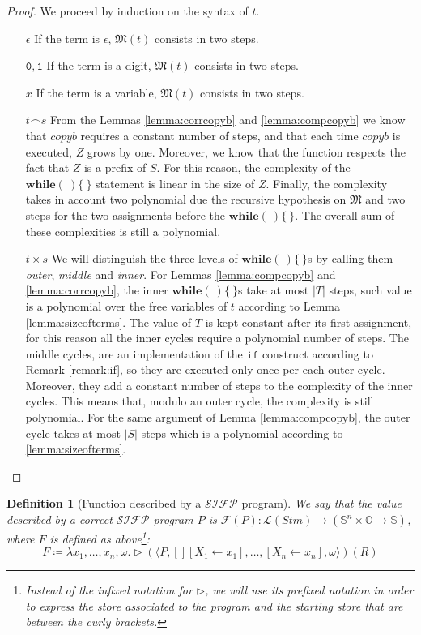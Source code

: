\documentclass[10pt]{amsart}
\newcommand{\SIFP}{\mathcal{SIFP}}
\newcommand{\conc}{\frown}
\newcommand{\zero}{\mathtt{0}}
\newcommand{\one}{\mathtt{1}}
\newcommand{\vone}{x}
\renewcommand{\SS}{\mathbb{S}}
\newcommand{\OO}{\mathbb{O}}
\newcommand{\If}{\mathtt{if}}
\newcommand{\lang}[1]{\mathcal L(#1)}
\newcommand{\while}[2]{\mathbf{while}(#1)\{#2\}}
\newcommand{\as}[2]{[#1 \leftarrow #2]}
\newcommand{\ssos}{\triangleright}
\newcommand{\MM}{\mathfrak M}
\newtheorem{defn}{Definition}
\begin{document}
\begin{proof}
We proceed by induction on the syntax of $t$.
\begin{itemize}
\item[$\epsilon$] If the term is $\epsilon$, $\MM(t)$ consists in two steps.
\item[$\zero,\one$] If the term is a digit,  $\MM(t)$ consists in two steps.
\item[$\vone$] If the term is a variable, $\MM(t)$ consists in two steps.
\item[$t \conc s$] From the Lemmas \ref{lemma:corrcopyb} and \ref{lemma:compcopyb} we know that $copyb$ requires a constant number of steps, and that each time $copyb$ is executed, $Z$ grows by one. Moreover, we know that the function respects the fact that $Z$ is a prefix of $S$. For this reason, the complexity of the $\while\ \ $ statement is linear in the size of $Z$. Finally, the complexity takes in account two polynomial due the recursive hypothesis on $\MM$ and two steps for the two assignments before the $\while\ \ $. The overall sum of these complexities is still a polynomial.
\item[$t \times s$] We will distinguish the three levels of $\while\ \ $s by calling them \emph{outer}, \emph{middle} and \emph{inner}. For Lemmas \ref{lemma:compcopyb} and \ref{lemma:corrcopyb}, the inner $\while\ \ $s take at most $|T|$ steps, such value is a polynomial over the free variables of $t$ according to Lemma \ref{lemma:sizeofterms}. The value of $T$ is kept constant after its first assignment, for this reason all the inner cycles require a polynomial number of steps. The middle cycles, are an implementation of the $\If$ construct according to Remark \ref{remark:if}, so they are executed only once per each outer cycle. Moreover, they add a constant number of steps to the complexity of the inner cycles. This means that, modulo an outer cycle, the complexity is still polynomial. For the same argument of Lemma \ref{lemma:compcopyb}, the outer cycle takes at most $|S|$ steps which is a polynomial according to \ref{lemma:sizeofterms}.
\end{itemize}
\end{proof}

\begin{defn}[Function described by a $\SIFP$ program]
We say that the value described by a correct $\SIFP$ program $P$ is $\mathcal F(P): \lang{Stm} \longrightarrow (\SS^n \times \OO \longrightarrow \SS)$, where $F$ is defined as above\footnote{Instead of the infixed notation for $\ssos$, we will use its prefixed notation in order to express the store associated to the program and the starting store that are between the curly brackets.}:
\[
F\coloneqq \lambda \vone_1, \ldots, \vone_n, \omega.\ssos(\langle P, []\as {X_1} {\vone_1}, \ldots, \as {X_n} {\vone_n}, \omega\rangle)(R)
\]
\end{defn}
\end{document}
